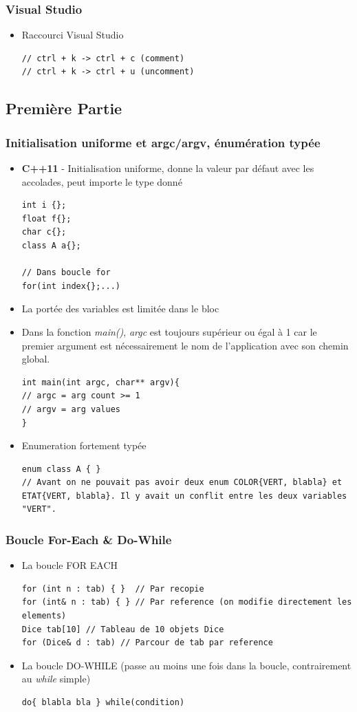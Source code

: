 \documentclass[12pt,a4paper]{article}
\begin{document}
\subsubsection{Visual Studio}
\begin{itemize}
\item Raccourci Visual Studio
\begin{lstlisting}
// ctrl + k -> ctrl + c (comment)
// ctrl + k -> ctrl + u (uncomment)
\end{lstlisting}
\end{itemize}

\subsection{Première Partie}
\subsubsection{Initialisation uniforme et argc/argv, énumération typée}
\begin{itemize}
\item \textbf{C++11} - Initialisation uniforme, donne la valeur par défaut avec les accolades, peut importe le type donné
\begin{lstlisting}
int i {};
float f{};
char c{};
class A a{};

// Dans boucle for
for(int index{};...)
\end{lstlisting}
\item La portée des variables est limitée dans le bloc
\item Dans la fonction \textit{main()}, \textit{argc} est toujours supérieur ou égal à 1 car le premier argument est nécessairement le nom de l'application avec son chemin global.
\begin{lstlisting}
int main(int argc, char** argv){
// argc = arg count >= 1
// argv = arg values
}
\end{lstlisting}
\item Enumeration fortement typée
\begin{lstlisting}
enum class A { }
// Avant on ne pouvait pas avoir deux enum COLOR{VERT, blabla} et ETAT{VERT, blabla}. Il y avait un conflit entre les deux variables "VERT".
\end{lstlisting}
\end{itemize}
\subsubsection{Boucle For-Each \& Do-While}
\begin{itemize}
\item La boucle FOR EACH
\begin{lstlisting}
for (int n : tab) { }  // Par recopie
for (int& n : tab) { } // Par reference (on modifie directement les elements)
Dice tab[10] // Tableau de 10 objets Dice
for (Dice& d : tab) // Parcour de tab par reference
\end{lstlisting}
\item La boucle DO-WHILE (passe au moins une fois dans la boucle, contrairement au \textit{while} simple)
\begin{lstlisting}
do{ blabla bla } while(condition)
\end{lstlisting}
\end{itemize}
\end{document}
